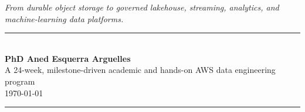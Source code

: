 \begin{titlepage}
{\large\itshape\color{primarydark}%
 From durable object storage to governed lakehouse, streaming, analytics, and machine-learning data platforms.}

\vfill

{\color{primary}\rule{\textwidth}{1pt}}\\[0.45cm]
{\LARGE\bfseries\color{primarydark} PhD Aned Esquerra Arguelles}\\[0.30cm]
{\large\color{codegray} A 24-week, milestone-driven academic and hands-on AWS data engineering program}\\[0.30cm]
{\large\color{codegray} \today}\\[0.45cm]
{\color{primary}\rule{\textwidth}{1pt}}
\end{titlepage}
